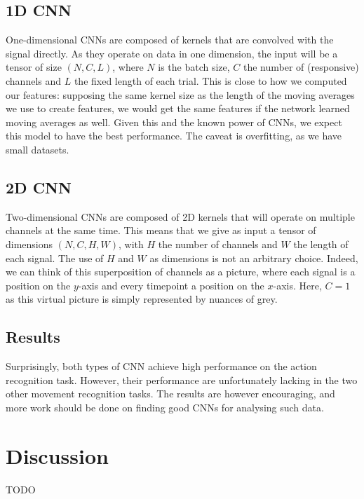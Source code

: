 \documentclass[10pt,conference,compsocconf]{IEEEtran}
\begin{document}
\subsection{1D CNN}
One-dimensional CNNs are composed of kernels that are convolved with the signal directly. As they operate on data in one dimension, the input will be a tensor of size \((N, C, L)\), where \(N\) is the batch size, \(C\) the number of (responsive) channels and \(L\) the fixed length of each trial. This is close to how we computed our features: supposing the same kernel size as the length of the moving averages we use to create features, we would get the same features if the network learned moving averages as well. Given this and the known power of CNNs, we expect this model to have the best performance. The caveat is overfitting, as we have small datasets.

\subsection{2D CNN}
Two-dimensional CNNs are composed of 2D kernels that will operate on multiple channels at the same time. This means that we give as input a tensor of dimensions \((N, C, H, W)\), with \(H\) the number of channels and \(W\) the length of each signal. The use of \(H\) and \(W\) as dimensions is not an arbitrary choice. Indeed, we can think of this superposition of channels as a picture, where each signal is a position on the \(y\)-axis and every timepoint a position on the \(x\)-axis. Here, \(C=1\) as this virtual picture is simply represented by nuances of grey.

\subsection{Results}
Surprisingly, both types of CNN achieve high performance on the action recognition task. However, their performance are unfortunately lacking in the two other movement recognition tasks. The results are however encouraging, and more work should be done on finding good CNNs for analysing such data.

\section{Discussion}
\label{sec:discussion}
TODO
\end{document}
